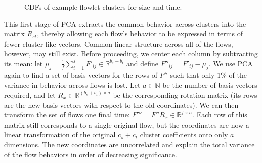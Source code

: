 \documentclass[conference]{IEEEtran}
\newcommand{\caps}[1]{{\small{#1}}}
\newcommand{\R}{\mathbb{R}}
\newcommand{\N}{\mathbb{N}}
\begin{document}
\begin{figure}
\vspace{-0.5em}
\begin{center}
\end{center}
\vspace{-0.3em}
\caption{{\footnotesize{CDF}}s of example flowlet clusters for size and time.}
\label{fig:cluster-examples}
\vspace{-1.35em}
\end{figure}

This first stage of \caps{PCA} extracts the common behavior across clusters into the matrix $R_{st}$, thereby allowing each flow's behavior to be expressed in terms of fewer cluster-like vectors. Common linear structure across all of the flows, however, may still exist. Before proceeding, we center each column by subtracting its mean: let $\mu_j = \frac{1}{f}\sum_{i=1}^{f}{F'_{ij}} \in \R^{b_s+b_t}$ and define $F''_{ij}=F'_{ij}-\mu_j$. We use \caps{PCA} again to find a set of basis vectors for the rows of $F''$ such that only 1\% of the variance in behavior across flows is lost. Let $a \in \N$ be the number of basis vectors required, and let $R_x \in \R^{(b_s+b_t) \times a}$ be the corresponding rotation matrix (its rows are the new basis vectors with respect to the old coordinates). We can then transform the set of flows one final time: $F''' = F'' R_x \in \R^{f \times a}$. Each row of this matrix still corresponds to a single original flow, but the coordinates are now a linear transformation of the original $c_s+c_t$ cluster coefficients onto only $a$ dimensions. The new coordinates are uncorrelated and explain the total variance of the flow behaviors in order of decreasing significance.
\end{document}
